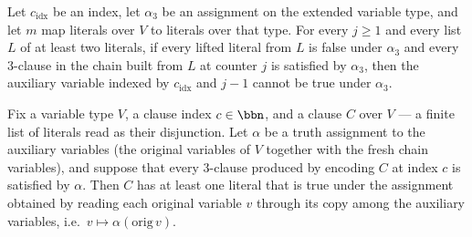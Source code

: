 \begin{lemma}
\label{SATTo3SAT.buildChain_forced_false}
\leanok
{}
Let $c_{\mathrm{idx}}$ be an index, let $\alpha_3$ be an assignment on the extended
variable type, and let $m$ map literals over $V$ to literals over that type. For every
$j\ge1$ and every list $L$ of at least two literals, if every lifted literal from $L$ is
false under $\alpha_3$ and every 3-clause in the chain built from $L$ at counter $j$ is
satisfied by $\alpha_3$, then the auxiliary variable indexed by $c_{\mathrm{idx}}$ and
$j-1$ cannot be true under $\alpha_3$.
\end{lemma}

\begin{lemma}
\label{SATTo3SAT.transformClause_soundness}
\leanok
{}
Fix a variable type $V$, a clause index $c \in \bbn$, and a clause $C$ over $V$ — a
finite list of literals read as their disjunction. Let $\alpha$ be a truth assignment to
the auxiliary variables (the original variables of $V$ together with the fresh chain
variables), and suppose that every $3$-clause produced by encoding $C$ at index $c$ is
satisfied by $\alpha$. Then $C$ has at least one literal that is true under the
assignment obtained by reading each original variable $v$ through its copy among the
auxiliary variables, i.e.\ $v \mapsto \alpha(\mathrm{orig}\,v)$.
\end{lemma}

